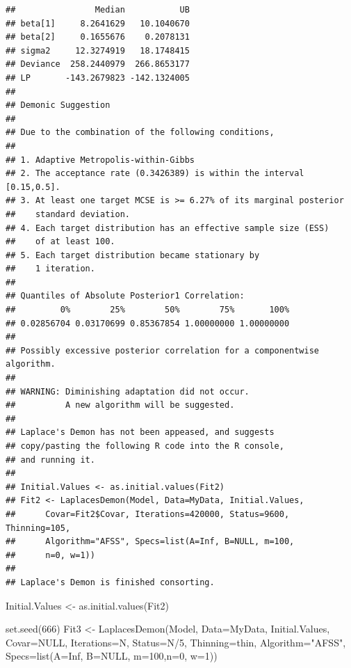 \documentclass[
]{book}
\newenvironment{Shaded}{\begin{snugshade}}{\end{snugshade}}
\newcommand{\AttributeTok}[1]{\textcolor[rgb]{0.77,0.63,0.00}{#1}}
\newcommand{\ConstantTok}[1]{\textcolor[rgb]{0.00,0.00,0.00}{#1}}
\newcommand{\DecValTok}[1]{\textcolor[rgb]{0.00,0.00,0.81}{#1}}
\newcommand{\FunctionTok}[1]{\textcolor[rgb]{0.00,0.00,0.00}{#1}}
\newcommand{\NormalTok}[1]{#1}
\newcommand{\OtherTok}[1]{\textcolor[rgb]{0.56,0.35,0.01}{#1}}
\newcommand{\SpecialCharTok}[1]{\textcolor[rgb]{0.00,0.00,0.00}{#1}}
\newcommand{\StringTok}[1]{\textcolor[rgb]{0.31,0.60,0.02}{#1}}
\begin{document}
\begin{verbatim}
##                Median           UB
## beta[1]     8.2641629   10.1040670
## beta[2]     0.1655676    0.2078131
## sigma2     12.3274919   18.1748415
## Deviance  258.2440979  266.8653177
## LP       -143.2679823 -142.1324005
## 
## Demonic Suggestion
## 
## Due to the combination of the following conditions,
## 
## 1. Adaptive Metropolis-within-Gibbs
## 2. The acceptance rate (0.3426389) is within the interval [0.15,0.5].
## 3. At least one target MCSE is >= 6.27% of its marginal posterior
##    standard deviation.
## 4. Each target distribution has an effective sample size (ESS)
##    of at least 100.
## 5. Each target distribution became stationary by
##    1 iteration.
## 
## Quantiles of Absolute Posterior1 Correlation:
##         0%        25%        50%        75%       100% 
## 0.02856704 0.03170699 0.85367854 1.00000000 1.00000000 
## 
## Possibly excessive posterior correlation for a componentwise algorithm.
## 
## WARNING: Diminishing adaptation did not occur.
##          A new algorithm will be suggested.
## 
## Laplace's Demon has not been appeased, and suggests
## copy/pasting the following R code into the R console,
## and running it.
## 
## Initial.Values <- as.initial.values(Fit2)
## Fit2 <- LaplacesDemon(Model, Data=MyData, Initial.Values,
##      Covar=Fit2$Covar, Iterations=420000, Status=9600, Thinning=105,
##      Algorithm="AFSS", Specs=list(A=Inf, B=NULL, m=100,
##      n=0, w=1))
## 
## Laplace's Demon is finished consorting.
\end{verbatim}

\begin{Shaded}
\begin{Highlighting}[]
\NormalTok{Initial.Values }\OtherTok{\textless{}{-}} \FunctionTok{as.initial.values}\NormalTok{(Fit2)}

\FunctionTok{set.seed}\NormalTok{(}\DecValTok{666}\NormalTok{)}
\NormalTok{Fit3 }\OtherTok{\textless{}{-}} \FunctionTok{LaplacesDemon}\NormalTok{(Model, }\AttributeTok{Data=}\NormalTok{MyData, Initial.Values,}
     \AttributeTok{Covar=}\ConstantTok{NULL}\NormalTok{, }\AttributeTok{Iterations=}\NormalTok{N, }\AttributeTok{Status=}\NormalTok{N}\SpecialCharTok{/}\DecValTok{5}\NormalTok{, }\AttributeTok{Thinning=}\NormalTok{thin,}
     \AttributeTok{Algorithm=}\StringTok{"AFSS"}\NormalTok{, }\AttributeTok{Specs=}\FunctionTok{list}\NormalTok{(}\AttributeTok{A=}\ConstantTok{Inf}\NormalTok{, }\AttributeTok{B=}\ConstantTok{NULL}\NormalTok{, }\AttributeTok{m=}\DecValTok{100}\NormalTok{,}\AttributeTok{n=}\DecValTok{0}\NormalTok{, }\AttributeTok{w=}\DecValTok{1}\NormalTok{))}
\end{Highlighting}
\end{Shaded}
\end{document}
